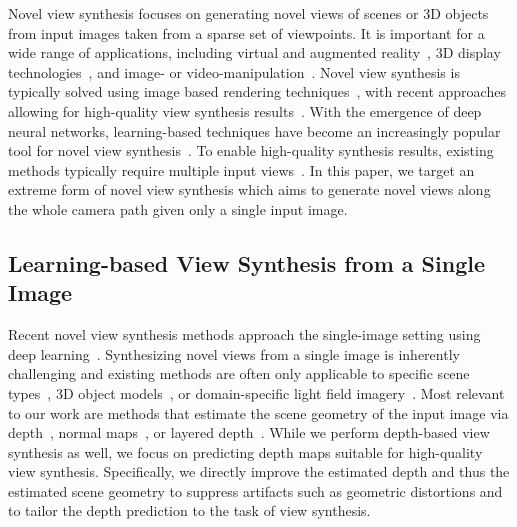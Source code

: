 \documentclass[acmtog,authorversion]{acmart}
\begin{document}
Novel view synthesis focuses on generating novel views of scenes or 3D objects from input images taken from a sparse set of viewpoints. It is important for a wide range of applications, including virtual and augmented reality~\cite{Hedman_TOG_2017, Huang_OTHER_2017, Rematas_CVPR_2018}, 3D display technologies~\cite{Didyk_TOG_2013, Kellnhofer_TOG_2017, Lai_OTHER_2016, Ranieri_CGF_2012, Xie_ECCV_2016}, and image- or video-manipulation~\cite{Klose_TOG_2015, Kopf_TOG_2016, Lang_TOG_2010, Liu_TOG_2009, Rahaman_TIP_2018, Zitnick_TOG_2004}. Novel view synthesis is typically solved using image based rendering techniques~\cite{Kang_OTHER_2006}, with recent approaches allowing for high-quality view synthesis results~\cite{Chaurasia_TOG_2013, Chaurasia_CGF_2011, Hedman_TOG_2017, Hedone_TOG_2018, Hedtwo_TOG_2018, Penner_TOG_2017}. With the emergence of deep neural networks, learning-based techniques have become an increasingly popular tool for novel view synthesis~\cite{Flynn_CVPR_2016, Ji_CVPR_2017, Kalantari_TOG_2016, Meshry_CVPR_2019, Mildenhall_TOG_2019, Sitzmann_CVPR_2019, Srinivasan_CVPR_2019, Thies_TOG_2019, Thies_ARXIV_2018, Xu_TOG_2019, Zhou_TOG_2018}. To enable high-quality synthesis results, existing methods typically require multiple input views~\cite{Kang_OTHER_2006, Penner_TOG_2017}. In this paper, we target an extreme form of novel view synthesis which aims to generate novel views along the whole camera path given only a single input image.

\subsection{Learning-based View Synthesis from a Single Image}

Recent novel view synthesis methods approach the single-image setting using deep learning~\cite{Tatarchenko_ARXIV_2015, Zhou_ECCV_2016}. Synthesizing novel views from a single image is inherently challenging and existing methods are often only applicable to specific scene types~\cite{Habtegebrial_ARXIV_2018, Liu_CVPR_2018, Nguyen_ARXIV_2019}, 3D object models~\cite{Olszewski_ARXIV_2019, Park_CVPR_2017, Rematas_PAMI_2017, Yan_NIPS_2016, Yang_NIPS_2015}, or domain-specific light field imagery~\cite{Srinivasan_ICCV_2017}. Most relevant to our work are methods that estimate the scene geometry of the input image via depth~\cite{Cun_OTHER_2019, Liu_CVPR_2018}, normal maps~\cite{Liu_CVPR_2018}, or layered depth~\cite{Tulsiani_ECCV_2018}. While we perform depth-based view synthesis as well, we focus on predicting depth maps suitable for high-quality view synthesis. Specifically, we directly improve the estimated depth and thus the estimated scene geometry to suppress artifacts such as geometric distortions and to tailor the depth prediction to the task of view synthesis.
\end{document}
